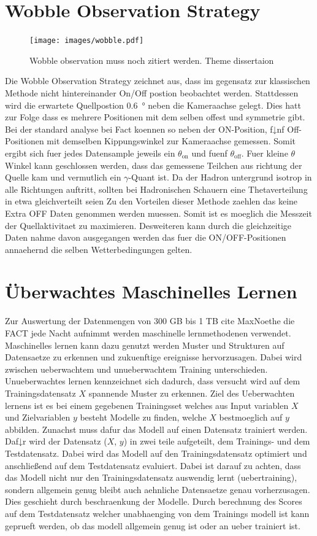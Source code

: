 \section{Wobble Observation Strategy}
\begin{figure}
  \texttt{[image: images/wobble.pdf]}
  \caption{Wobble observation muss noch zitiert werden. Theme dissertaion}
\end{figure}
Die Wobble Observation Strategy zeichnet aus, dass im gegensatz zur klassischen Methode nicht hintereinander On/Off postion beobachtet werden. Stattdessen wird die erwartete Quellpostion \SI{0.6}{\degree} neben die Kameraachse gelegt. Dies hatt zur Folge dass es mehrere Positionen mit dem selben offest und symmetrie gibt. Bei der standard analyse bei Fact koennen so neben der ON-Position, f↓nf Off-Positionen mit demselben Kippungswinkel zur Kameraachse gemessen. Somit ergibt sich fuer jedes Datensample jeweils ein $\theta_\text{on}$ und fuenf $\theta_\text{off}$. Fuer kleine $\theta$ Winkel kann geschlossen werden, dass das gemessene Teilchen aus richtung der Quelle kam und vermutlich ein $\gamma$-Quant ist. Da der Hadron untergrund isotrop in alle Richtungen auftritt, sollten bei Hadronischen Schauern eine Thetaverteilung in etwa gleichverteilt seien  Zu den Vorteilen dieser Methode zaehlen das keine Extra OFF Daten genommen werden muessen. Somit ist es moeglich die Messzeit der Quellaktivitaet zu maximieren. Desweiteren kann durch die gleichzeitige Daten nahme davon ausgegangen werden das fuer die ON/OFF-Positionen annaehernd die selben Wetterbedingungen gelten. 

\section{Überwachtes Maschinelles Lernen}
Zur Auswertung der Datenmengen von 300 GB bis 1 TB cite MaxNoethe die FACT jede Nacht aufnimmt werden maschinelle lernmethodenen verwendet. Maschinelles lernen kann dazu genutzt werden Muster und Strukturen auf Datensaetze zu erkennen und zukuenftige ereignisse hervorzusagen. Dabei wird zwischen ueberwachtem und unueberwachtem Training unterschieden. Unueberwachtes lernen kennzeichnet sich dadurch, dass versucht wird auf dem Trainingsdatensatz $X$ spannende Muster zu erkennen.  Ziel des Ueberwachten lernens ist es bei einem gegebenen Trainingsset welches aus Input variablen $X$ und Zielvariablen $y$ besteht Modelle zu finden, welche $X$ bestmoeglich auf $y$ abbilden. \newline
Zunachst muss dafur das Modell auf einen Datensatz trainiert werden. Daf↓r wird der Datensatz ($X$, $y$) in zwei teile aufgeteilt, dem Trainings- und dem Testdatensatz. Dabei wird das Modell auf den Trainingsdatensatz optimiert und anschließend auf dem Testdatensatz evaluiert. Dabei ist darauf zu achten, dass das Modell nicht nur den Trainingsdatensatz auswendig lernt (uebertraining), sondern allgemein genug bleibt auch aehnliche Datensaetze genau vorherzusagen. Dies geschieht durch beschraenkung der Modelle. Durch berechnung des Scores auf dem Testdatensatz welcher unabhaenging von dem Trainings modell ist kann geprueft werden, ob das modell allgemein genug ist oder an ueber trainiert ist.

